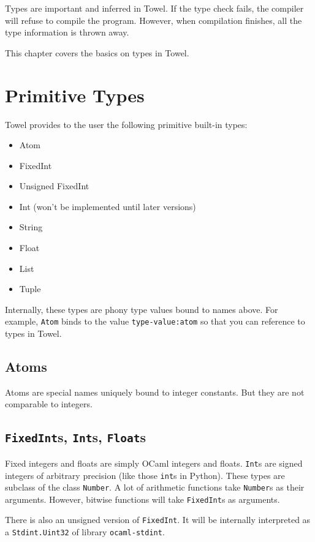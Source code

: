 \documentclass{book}
\begin{document}
Types are important and inferred in Towel. If the type check fails, the compiler will refuse to compile the program. However, when compilation finishes, all the type information is thrown away.

This chapter covers the basics on types in Towel.

\section{Primitive Types}

Towel provides to the user the following primitive built-in types:
\begin{itemize}
\item Atom
\item FixedInt
\item Unsigned FixedInt
\item Int (won't be implemented until later versions)
\item String
\item Float
\item List
\item Tuple
\end{itemize}

Internally, these types are phony type values bound to names above. For example, \texttt{Atom} binds to the value \texttt{type-value:atom} so that you can reference to types in Towel.

\subsection{Atoms}

Atoms are special names uniquely bound to integer constants. But they are not comparable to integers.

\subsection{\texttt{FixedInt}s, \texttt{Int}s, \texttt{Float}s}

Fixed integers and floats are simply OCaml integers and floats. \texttt{Int}s are signed integers of arbitrary precision (like those \texttt{int}s in Python). These types are subclass of the class \texttt{Number}. A lot of arithmetic functions take \texttt{Number}s as their arguments. However, bitwise functions will take \texttt{FixedInt}s as arguments.

There is also an unsigned version of \texttt{FixedInt}. It will be internally interpreted as a \texttt{Stdint.Uint32} of library \texttt{ocaml-stdint}.
\end{document}

